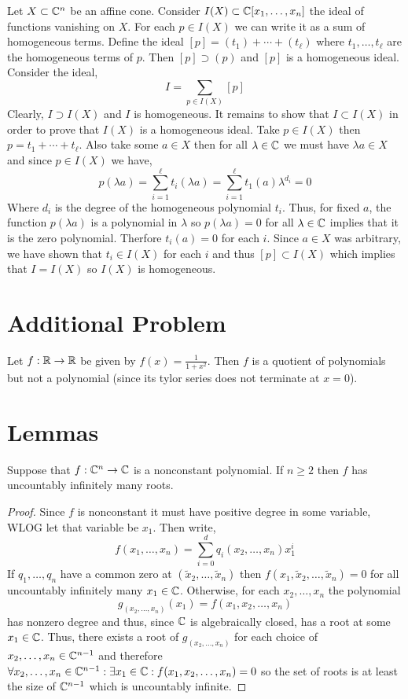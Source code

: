 \documentclass[12pt]{article}
\begin{document}
Let $X \subset \mathbb{C}^n$ be an affine cone. Consider $I(X) \subset \mathbb{C}[x_1, \dots, x_n]$ the ideal of functions vanishing on $X$. For each $p \in I(X)$ we can write it as a sum of homogeneous terms. Define the ideal $[p] = (t_1) + \cdots + (t_\ell)$ where $t_1, \dots, t_\ell$ are the homogeneous terms of $p$. Then $[p] \supset (p)$ and $[p]$ is a homogeneous ideal. Consider the ideal,
\[ I = \sum_{p \in I(X)} [p] \]
Clearly, $I \supset I(X)$ and $I$ is homogeneous. It remains to show that $I \subset I(X)$ in order to prove that $I(X)$ is a homogeneous ideal. Take $p \in I(X)$ then $p = t_1 + \cdots + t_\ell$. Also take some $a \in X$ then for all $\lambda \in \mathbb{C}$ we must have $\lambda a \in X$ and since $p \in I(X)$ we have,
\[ p(\lambda a) = \sum_{i = 1}^\ell t_i(\lambda a) = \sum_{i = 1}^\ell t_1(a) \lambda^{d_i} = 0 \]
Where $d_i$ is the degree of the homogeneous polynomial $t_i$. Thus, for fixed $a$, the function $p(\lambda a)$ is a polynomial in $\lambda$ so $p(\lambda a) = 0$ for all $\lambda \in \mathbb{C}$ implies that it is the zero polynomial. Therfore $t_i(a) = 0$ for each $i$. Since $a \in X$ was arbitrary, we have shown that $t_i \in I(X)$ for each $i$ and thus $[p] \subset I(X)$ which implies that $I = I(X)$ so $I(X)$ is homogeneous.  

\section{Additional Problem}

Let $f : \mathbb{R} \to \mathbb{R}$ be given by $f(x) = \frac{1}{1 + x^2}$. Then $f$ is a quotient of polynomials but not a polynomial (since its tylor series does not terminate at $x = 0$). 

\section{Lemmas}

\begin{lemma} \label{poly_num_zeros}
Suppose that $f : \mathbb{C}^n \to \mathbb{C}$ is a nonconstant polynomial. If $n \ge 2$ then $f$ has uncountably infinitely many roots.
\end{lemma}

\begin{proof}
Since $f$ is nonconstant it must have positive degree in some variable, WLOG let that variable be $x_1$. Then write,
\[ f(x_1, \dots, x_n) = \sum_{i = 0}^d q_i(x_2, \dots, x_n) x_1^i \]
If $q_1, \dots, q_n$ have a common zero at $(\tilde{x}_2, \dots, \tilde{x}_n)$ then $f(x_1, \tilde{x}_2, \dots, \tilde{x}_n) = 0$ for all uncountably infinitely many $x_1 \in \mathbb{C}$. Otherwise, for each $x_2, \dots, x_n$ the polynomial 
\[g_{(x_2, \dots, x_n)}(x_1) = f(x_1, x_2, \dots, x_n)\] has nonzero degree and thus, since $\mathbb{C}$ is algebraically closed, has a root at some $x_1 \in \mathbb{C}$. Thus, there exists a root of $g_{(x_2, \dots, x_n)}$ for each choice of $x_2, \dots, x_n \in \mathbb{C}^{n-1}$ and therefore $\forall x_2, \dots, x_n \in \mathbb{C}^{n-1} : \exists x_1 \in \mathbb{C} : f(x_1, x_2, \dots, x_n) = 0$ so the set of roots is at least the size of $\mathbb{C}^{n-1}$ which is uncountably infinite.
\end{proof}
\end{document}

